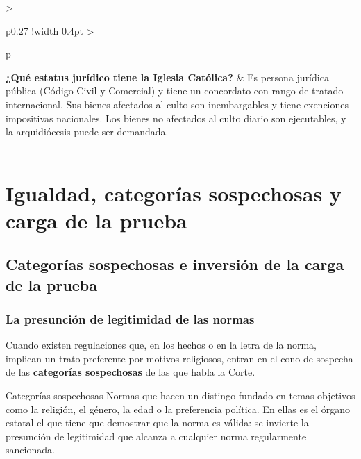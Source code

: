 \documentclass[12pt,oneside]{book}
\begin{document}
\begin{longtable}{
    >{\raggedright\arraybackslash}p{}
    !{\vrule width 0.4pt}
    >{\raggedright\arraybackslash}p{\tabcolsep-0.4pt\relax}
}
\textbf{¿Qué estatus jurídico tiene la Iglesia Católica?} &
Es persona jurídica pública (Código Civil y Comercial) y tiene un concordato con rango de tratado internacional. Sus bienes afectados al culto son inembargables y tiene exenciones impositivas nacionales. Los bienes no afectados al culto diario son ejecutables, y la arquidiócesis puede ser demandada. \\

\midrule
{} \\
\end{longtable}

\chapter[Igualdad y categorías sospechosas]{Igualdad, categorías sospechosas y carga de la prueba}

\section{Categorías sospechosas e inversión de la carga de la prueba}

\subsection{La presunción de legitimidad de las normas}

Cuando existen regulaciones que, en los hechos o en la letra de la norma, implican un trato preferente por motivos religiosos, entran en el cono de sospecha de las \textbf{categorías sospechosas} de las que habla la Corte.

\begin{definition}{Categorías sospechosas}
Normas que hacen un distingo fundado en temas objetivos como la religión, el género, la edad o la preferencia política. En ellas es el órgano estatal el que tiene que demostrar que la norma es válida: se invierte la presunción de legitimidad que alcanza a cualquier norma regularmente sancionada.
\end{definition}
\end{document}
